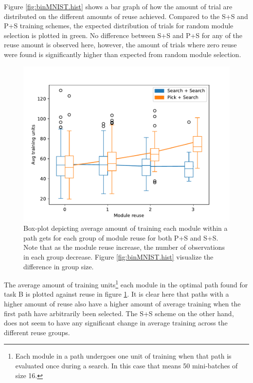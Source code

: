 Figure \ref{fig:binMNIST.hist} shows a bar graph of how the amount of trial are distributed on the different amounts of reuse achieved. Compared to the S+S and P+S training schemes, the expected distribution of trials for random module selection is plotted in green. No difference between S+S and P+S for any of the reuse amount is observed here, however, the amount of trials where zero reuse were found is significantly higher than expected from random module selection. 

\begin{figure}[t]
    \includegraphics[width=\textwidth]{Chapters/4.Experiments/exp1/figures/BIN_training_boxplot.pdf}
    \caption{Box-plot depicting average amount of training each module within a path gets for each group of module reuse for both P+S and S+S. Note that as the module reuse increase, the number of observations in each group decrease. Figure \ref{fig:binMNIST.hist} visualize the difference in group size.}
    \label{fig:binMNIST.box}
\end{figure}

The average amount of training units\footnote{Each module in a path undergoes one unit of training when that path is evaluated once during a search. In this case that means 50 mini-batches of size 16.} each module in the optimal path found for task B is plotted against reuse in figure \ref{fig:binMNIST.box}. It is clear here that paths with a higher amount of reuse also have a higher amount of average training when the first path have arbitrarily been selected. The S+S scheme on the other hand, does not seem to have any significant change in average training across the different reuse groups. 


